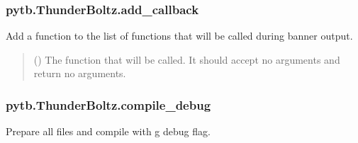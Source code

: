 \documentclass[letterpaper,10pt,english,openany,oneside]{sphinxmanual}
\begin{document}
\begin{fulllineitems}
\sphinxstepscope


\subsubsection{pytb.ThunderBoltz.add\_callback}
\label{\detokenize{api/pytb.ThunderBoltz.add_callback:pytb-thunderboltz-add-callback}}\label{\detokenize{api/pytb.ThunderBoltz.add_callback::doc}}

\begin{fulllineitems}
\label{\detokenize{api/pytb.ThunderBoltz.add_callback:pytb.ThunderBoltz.add_callback}}
\pysigstartsignatures
{}
\pysigstopsignatures
\sphinxAtStartPar
Add a function to the list of functions that will be
called during banner output.
\begin{quote}\begin{description}
\sphinxAtStartPar
{} (\sphinxstyleliteralemphasis{\sphinxupquote{{[}}}\sphinxstyleliteralemphasis{\sphinxupquote{,}}\sphinxstyleliteralemphasis{\sphinxupquote{{]}}}) \textendash{} The function that will be called. It
should accept no arguments and return no arguments.

\end{description}\end{quote}

\end{fulllineitems}


\sphinxstepscope


\subsubsection{pytb.ThunderBoltz.compile\_debug}
\label{\detokenize{api/pytb.ThunderBoltz.compile_debug:pytb-thunderboltz-compile-debug}}\label{\detokenize{api/pytb.ThunderBoltz.compile_debug::doc}}

\begin{fulllineitems}
\label{\detokenize{api/pytb.ThunderBoltz.compile_debug:pytb.ThunderBoltz.compile_debug}}
\pysigstartsignatures
{}
\pysigstopsignatures
\sphinxAtStartPar
Prepare all files and compile with \sphinxhyphen{}g debug flag.


\end{fulllineitems}
\end{fulllineitems}
\end{document}
